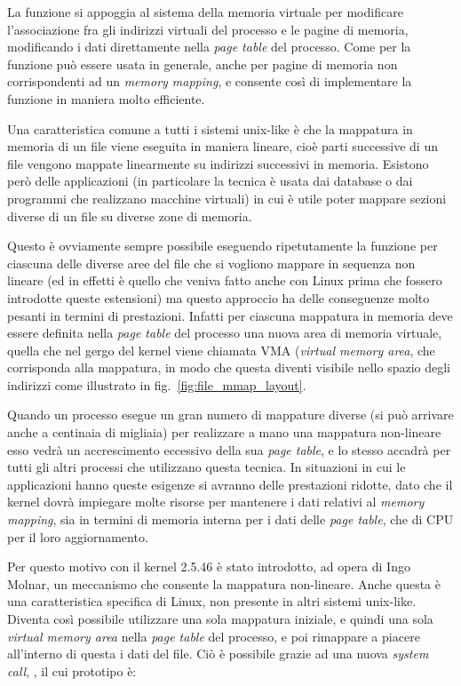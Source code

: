 La funzione si appoggia al sistema della memoria virtuale per modificare
l'associazione fra gli indirizzi virtuali del processo e le pagine di memoria,
modificando i dati direttamente nella \textit{page table} del processo. Come
per  la funzione può essere usata in generale, anche per pagine
di memoria non corrispondenti ad un \textit{memory mapping}, e consente così
di implementare la funzione  in maniera molto efficiente.

Una caratteristica comune a tutti i sistemi unix-like è che la mappatura in
memoria di un file viene eseguita in maniera lineare, cioè parti successive di
un file vengono mappate linearmente su indirizzi successivi in memoria.
Esistono però delle applicazioni (in particolare la tecnica è usata dai
database o dai programmi che realizzano macchine virtuali) in cui è utile
poter mappare sezioni diverse di un file su diverse zone di memoria.

Questo è ovviamente sempre possibile eseguendo ripetutamente la funzione
 per ciascuna delle diverse aree del file che si vogliono mappare
in sequenza non lineare (ed in effetti è quello che veniva fatto anche con
Linux prima che fossero introdotte queste estensioni) ma questo approccio ha
delle conseguenze molto pesanti in termini di prestazioni.  Infatti per
ciascuna mappatura in memoria deve essere definita nella \textit{page table}
del processo una nuova area di memoria virtuale, quella che nel gergo del
kernel viene chiamata VMA (\textit{virtual memory area}, che corrisponda alla
mappatura, in modo che questa diventi visibile nello spazio degli indirizzi
come illustrato in fig.~\ref{fig:file_mmap_layout}.

Quando un processo esegue un gran numero di mappature diverse (si può arrivare
anche a centinaia di migliaia) per realizzare a mano una mappatura non-lineare
esso vedrà un accrescimento eccessivo della sua \textit{page table}, e lo
stesso accadrà per tutti gli altri processi che utilizzano questa tecnica. In
situazioni in cui le applicazioni hanno queste esigenze si avranno delle
prestazioni ridotte, dato che il kernel dovrà impiegare molte risorse per
mantenere i dati relativi al \textit{memory mapping}, sia in termini di
memoria interna per i dati delle \textit{page table}, che di CPU per il loro
aggiornamento.

Per questo motivo con il kernel 2.5.46 è stato introdotto, ad opera di Ingo
Molnar, un meccanismo che consente la mappatura non-lineare. Anche questa è
una caratteristica specifica di Linux, non presente in altri sistemi
unix-like.  Diventa così possibile utilizzare una sola mappatura iniziale, e
quindi una sola \textit{virtual memory area} nella \textit{page table} del
processo, e poi rimappare a piacere all'interno di questa i dati del file. Ciò
è possibile grazie ad una nuova \textit{system call},
, il cui prototipo è:

